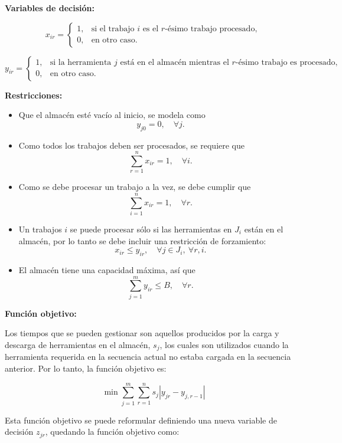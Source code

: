 \textbf{Variables de decisión:}

\[
x_{ir} =
\begin{cases}
1, & \text{si el trabajo } i \text{ es el } r\text{-ésimo trabajo procesado},\\
0, & \text{en otro caso}.
\end{cases}
\]

\[
y_{ir} =
\begin{cases}
1, & \text{si la herramienta } j \text{ está en el almacén mientras el } r\text{-ésimo trabajo es procesado},\\
0, & \text{en otro caso}.
\end{cases}
\]

\textbf{Restricciones:}

\begin{itemize}
    \item Que el almacén esté vacío al inicio, se modela como
    \[
    y_{j0} = 0, \quad \forall j.
    \]

    \item Como todos los trabajos deben ser procesados, se requiere que
    \[
    \sum_{r=1}^{n} x_{ir} = 1, \quad \forall i.
    \]

    \item Como se debe procesar un trabajo a la vez, se debe cumplir que
    \[
    \sum_{i=1}^{n} x_{ir} = 1, \quad \forall r.
    \]

    \item Un trabajos $i$ se puede procesar sólo si las herramientas en $J_i$ están en el almacén, por lo tanto se debe incluir una restricción de forzamiento:
    \[
    x_{ir} \leq y_{ir}, \quad \forall j \in J_i, \ \forall r, i.
    \]

    \item El almacén tiene una capacidad máxima, así que
    \[
    \sum_{j=1}^{m} y_{ir} \leq B, \quad \forall r.
    \]
\end{itemize}

\textbf{Función objetivo:}

Los tiempos que se pueden gestionar son aquellos producidos por la carga y descarga de herramientas en el almacén, $s_j$, los cuales son utilizados cuando la herramienta requerida en la secuencia actual no estaba cargada en la secuencia anterior. Por lo tanto, la función objetivo es:

\[
\min \sum_{j=1}^{m} \sum_{r=1}^{n} s_j \left|y_{jr} - y_{j,r-1}\right|
\]

Esta función objetivo se puede reformular definiendo una nueva variable de decisión $z_{jr}$, quedando la función objetivo como:

